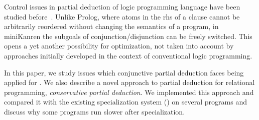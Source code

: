 Control issues in partial deduction of logic programming language \pro have been studied before~\cite{leuschel2002logic}.
Unlike Prolog, where atoms in the rhs of a clause cannot be arbitrarily reordered without changing the semantics of a program, in miniKanren the subgoals of conjunction/disjunction can be freely switched.
This opens a yet another possibility for optimization, not taken into account by approaches initially developed in the context of conventional logic programming.

In this paper, we study issues which conjunctive partial deduction faces being applied for \mk.
We also describe a novel approach to partial deduction for relational programming, \emph{conservative partial deduction}.
We implemented this approach and compared it with the existing specialization system (\ecce) on several programs and discuss why some \mk programs run slower after specialization.
